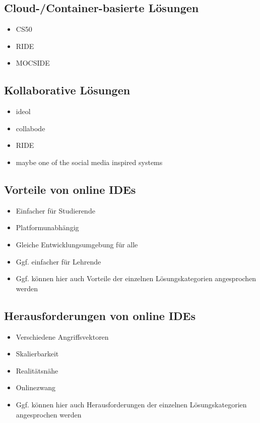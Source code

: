 \subsection{Cloud-/Container-basierte Lösungen} \label{cloud-container-based-approaches}

\begin{itemize}
    \item CS50
    \item RIDE
    \item MOCSIDE
\end{itemize}

\subsection{Kollaborative Lösungen} \label{collaborative-approaches}

\begin{itemize}
    \item ideol
    \item collabode
    \item RIDE
    \item maybe one of the social media inspired systems
\end{itemize}

\subsection{Vorteile von online IDEs} \label{advantages-online-ides}

\begin{itemize}
    \item Einfacher für Studierende
    \item Platformunabhängig
    \item Gleiche Entwicklungsumgebung für alle
    \item Ggf. einfacher für Lehrende
    \item Ggf. können hier auch Vorteile der einzelnen Lösungskategorien angesprochen werden
\end{itemize}

\subsection{Herausforderungen von online IDEs} \label{challenges-online-ides}

\begin{itemize}
    \item Verschiedene Angriffsvektoren
    \item Skalierbarkeit
    \item Realitätsnähe
    \item Onlinezwang
    \item Ggf. können hier auch Herausforderungen der einzelnen Lösungskategorien angesprochen werden
\end{itemize}

